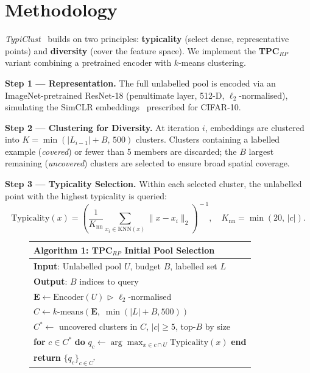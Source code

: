 \documentclass[11pt, twocolumn]{article}
\begin{document}
\section{Methodology}

\textit{TypiClust}~\cite{hacohen2022} builds on two principles:
\textbf{typicality} (select dense, representative points) and
\textbf{diversity} (cover the feature space).
We implement the \textbf{TPC$_{RP}$} variant combining a pretrained encoder
with $k$-means clustering.

\textbf{Step 1 — Representation.}
The full unlabelled pool is encoded via an ImageNet-pretrained ResNet-18
(penultimate layer, 512-D, $\ell_2$-normalised), simulating the SimCLR
embeddings~\cite{chen2020simclr} prescribed for CIFAR-10.

\textbf{Step 2 — Clustering for Diversity.}
At iteration $i$, embeddings are clustered into
$K{=}\min(|L_{i-1}|{+}B,\,500)$ clusters.
Clusters containing a labelled example (\textit{covered}) or fewer than 5
members are discarded; the $B$ largest remaining (\textit{uncovered}) clusters
are selected to ensure broad spatial coverage.

\textbf{Step 3 — Typicality Selection.}
Within each selected cluster, the unlabelled point with the highest typicality
is queried:
\begin{equation}
  \mathrm{Typicality}(x)
    = \!\left(\frac{1}{K_{\mathrm{nn}}}
        \sum_{x_i \in \mathrm{KNN}(x)} \|x - x_i\|_2
      \right)^{\!-1}, \quad
  K_{\mathrm{nn}} = \min(20,\,|c|).
  \label{eq:typicality}
\end{equation}

\begin{figure}[htbp]
\centering
\small
\renewcommand{\arraystretch}{1.05}
\begin{tabular}{l}
\toprule
\textbf{Algorithm 1}: TPC$_{RP}$ Initial Pool Selection \\
\midrule
\textbf{Input}: Unlabelled pool $U$, budget $B$, labelled set $L$ \\
\textbf{Output}: $B$ indices to query \\[1pt]
$\mathbf{E} \leftarrow \mathrm{Encoder}(U)$ \hfill $\triangleright$ $\ell_2$-normalised \\
$C \leftarrow k\text{-means}(\mathbf{E},\; \min(|L|+B, 500))$ \\
$C^* \leftarrow$ uncovered clusters in $C$, $|c|\!\geq\!5$, top-$B$ by size \\
\textbf{for} $c \in C^*$ \textbf{do} \;
$q_c \leftarrow \arg\max_{x \in c \cap U}\mathrm{Typicality}(x)$ \;
\textbf{end} \\
\textbf{return} $\{q_c\}_{c \in C^*}$ \\
\bottomrule
\end{tabular}
\label{alg:tpcrp}
\end{figure}
\end{document}

